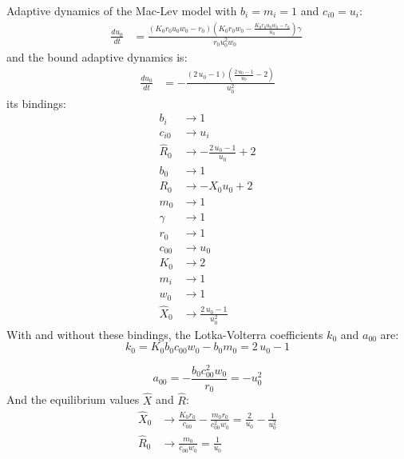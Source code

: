 \documentclass{article}
\begin{document}
Adaptive dynamics of the Mac-Lev model with $b_i=m_i=1$ and $c_{i0} = u_i$:
\[\begin{align*}
\frac{du_{0}}{dt} &= \frac{{\left(K_{0} r_{0} u_{0} w_{0} - r_{0}\right)} {\left(K_{0} r_{0} w_{0} - \frac{K_{0} r_{0} u_{0} w_{0} - r_{0}}{u_{0}}\right)} \gamma}{r_{0} u_{0}^{2} w_{0}}
\end{align*} \
\]
and the bound adaptive dynamics is:\begin{align*}
\frac{du_{0}}{dt} &= -\frac{{\left(2 \, u_{0} - 1\right)} {\left(\frac{2 \, u_{0} - 1}{u_{0}} - 2\right)}}{u_{0}^{2}}
\end{align*}its bindings:\begin{align*}
  b_{i} &\to 1 \\
  c_{i0} &\to u_{i} \\
  \hat{R}_{0} &\to -\frac{2 \, u_{0} - 1}{u_{0}} + 2 \\
  b_{0} &\to 1 \\
  R_{0} &\to -X_{0} u_{0} + 2 \\
  m_{0} &\to 1 \\
  \gamma &\to 1 \\
  r_{0} &\to 1 \\
  c_{00} &\to u_{0} \\
  K_{0} &\to 2 \\
  m_{i} &\to 1 \\
  w_{0} &\to 1 \\
  \hat{X}_{0} &\to \frac{2 \, u_{0} - 1}{u_{0}^{2}}
\end{align*}With and without these bindings, the Lotka-Volterra coefficients $k_0$ and $a_{00}$ are:
\[
  k_{0} = K_{0} b_{0} c_{00} w_{0} - b_{0} m_{0} = 2 \, u_{0} - 1
\]

\[
  a_{00} = -\frac{b_{0} c_{00}^{2} w_{0}}{r_{0}} = -u_{0}^{2}
\]
And the equilibrium values $\hat X$ and $\hat R$:\begin{align*}
  \hat X_0 &\to \frac{K_{0} r_{0}}{c_{00}} - \frac{m_{0} r_{0}}{c_{00}^{2} w_{0}} = \frac{2}{u_{0}} - \frac{1}{u_{0}^{2}}\\
  \hat R_0 &\to \frac{m_{0}}{c_{00} w_{0}} = \frac{1}{u_{0}}
\end{align*}
\end{document}
